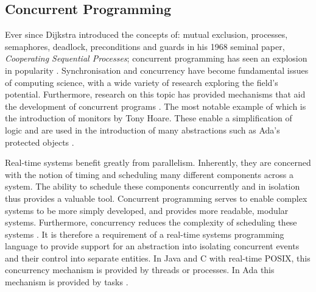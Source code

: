\subsection{Concurrent Programming}
Ever since Dijkstra introduced the concepts of: 
mutual exclusion, processes, semaphores, deadlock, 
preconditions and guards in his 1968 seminal paper,
\emph{Cooperating Sequential Processes}; concurrent programming has seen an
explosion in popularity \cite{Dijkstra}.  Synchronisation and
concurrency have become fundamental issues of computing science, with a wide
variety of research exploring the field's potential. 
Furthermore, research on this topic has provided mechanisms that aid 
the development of concurrent programs
\cite{Sutter:2005:SCR:1095408.1095421,Hansen:1972:SM:361454.361473}.  The most
notable example of which is the introduction of monitors by Tony Hoare.
These enable a simplification of logic and are used in the introduction of many
abstractions such as Ada's protected objects
\cite{Hoare:1974:MOS:355620.361161}.  
\par\bigskip\noindent
Real-time systems benefit greatly from parallelism. Inherently, they are
concerned with the notion of timing and scheduling many different components
across a system.  The ability to schedule these components concurrently and in
isolation thus provides a valuable tool. Concurrent programming serves to
enable complex systems to be more simply developed, and provides 
more readable, modular systems. Furthermore, concurrency reduces the complexity
of scheduling these systems \cite{real-time-systems}.  It is therefore a
requirement of a real-time systems programming language to provide support for
an abstraction into isolating concurrent events and their control into separate
entities.  In Java and C with real-time POSIX, this concurrency mechanism is
provided by threads or processes. In Ada this mechanism is provided by tasks
\cite[p251]{gehani1989concurrent}.

